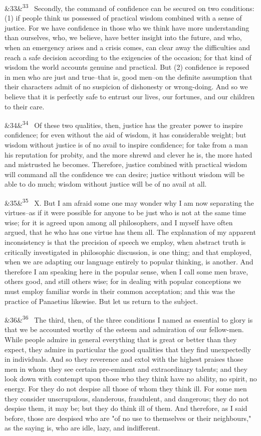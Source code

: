 \documentclass[12pt]{article}
\newcommand{\para}[1][]{\par\noindent\ifx&#1&\else\textsuperscript{\footnotesize #1}~\fi}
\begin{document}
\para[33] Secondly, the command of confidence can be secured on two conditions: (1) if people think us possessed of practical wisdom combined with a sense of justice. For we have confidence in those who we think have more understanding than ourselves, who, we believe, have better insight into the future, and who, when an emergency arises and a crisis comes, can clear away the difficulties and reach a safe decision according to the exigencies of the occasion; for that kind of wisdom the world accounts genuine and practical. But (2) confidence is reposed in men who are just and true--that is, good men--on the definite assumption that their characters admit of no suspicion of dishonesty or wrong-doing. And so we believe that it is perfectly safe to entrust our lives, our fortunes, and our children to their care.

\para[34] Of these two qualities, then, justice has the greater power to inspire confidence; for even without the aid of wisdom, it has considerable weight; but wisdom without justice is of no avail to inspire confidence; for take from a man his reputation for probity, and the more shrewd and clever he is, the more hated and mistrusted he becomes. Therefore, justice combined with practical wisdom will command all the confidence we can desire; justice without wisdom will be able to do much; wisdom without justice will be of no avail at all.

\para[35] X. But I am afraid some one may wonder why I am now separating the virtues--as if it were possible for anyone to be just who is not at the same time wise; for it is agreed upon among all philosophers, and I myself have often argued, that he who has one virtue has them all. The explanation of my apparent inconsistency is that the precision of speech we employ, when abstract truth is critically investigated in philosophic discussion, is one thing; and that employed, when we are adapting our language entirely to popular thinking, is another. And therefore I am speaking here in the popular sense, when I call some men brave, others good, and still others wise; for in dealing with popular conceptions we must employ familiar words in their common acceptation; and this was the practice of Panaetius likewise. But let us return to the subject.

\para[36] The third, then, of the three conditions I named as essential to glory is that we be accounted worthy of the esteem and admiration of our fellow-men. While people admire in general everything that is great or better than they expect, they admire in particular the good qualities that they find unexpectedly in individuals. And so they reverence and extol with the highest praises those men in whom they see certain pre-eminent and extraordinary talents; and they look down with contempt upon those who they think have no ability, no spirit, no energy. For they do not despise all those of whom they think ill. For some men they consider unscrupulous, slanderous, fraudulent, and dangerous; they do not despise them, it may be; but they do think ill of them. And therefore, as I said before, those are despised who are "of no use to themselves or their neighbours," as the saying is, who are idle, lazy, and indifferent.
\end{document}
